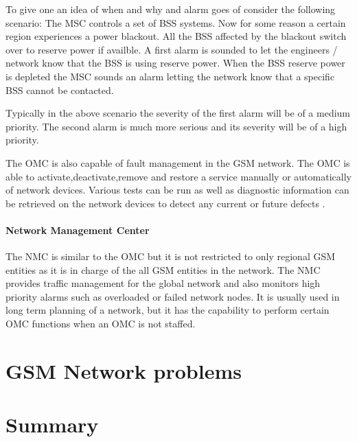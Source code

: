 To give one an idea of when and why and alarm goes of consider the following scenario: The MSC controls a set of BSS systems. Now for some reason a certain region experiences a power blackout. All the BSS affected by the blackout switch over to reserve power if availble. A first alarm is sounded to let the engineers / network know that the BSS is using reserve power. When the BSS reserve power is depleted the MSC sounds an alarm letting the network know that a specific BSS cannot be contacted.

Typically in the above scenario the severity of the first alarm will be of a medium priority. The second alarm is much more serious and its severity will be of a high priority.

The OMC is also capable of fault management in the GSM network. The OMC is able to activate,deactivate,remove and restore a service manually or automatically of network devices. Various tests can be run as well as diagnostic information can be retrieved on the network devices to detect any current or future defects \cite{GSMSysEngin}.

\paragraph{Network Management Center}
The NMC is similar to the OMC but it is not restricted to only regional GSM entities as it is in charge of the all GSM entities in the network. The NMC provides traffic management for the global network and also monitors high priority alarms such as overloaded or failed network nodes. It is usually used in long term planning of a network, but it has the capability to perform certain OMC functions when an OMC is not staffed. 

\section{GSM Network problems}
\section{Summary}
